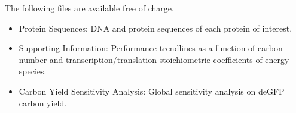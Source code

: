 \documentclass[journal=asbcd6,manuscript=article]{achemso}
\begin{document}
\begin{suppinfo}
The following files are available free of charge.
\begin{itemize}
  \item Protein Sequences: DNA and protein sequences of each protein of interest.
  \item Supporting Information: Performance trendlines as a function of carbon number and transcription/translation stoichiometric coefficients of energy species.
  \item Carbon Yield Sensitivity Analysis: Global sensitivity analysis on deGFP carbon yield.
\end{itemize}
\end{suppinfo}


\end{document}

